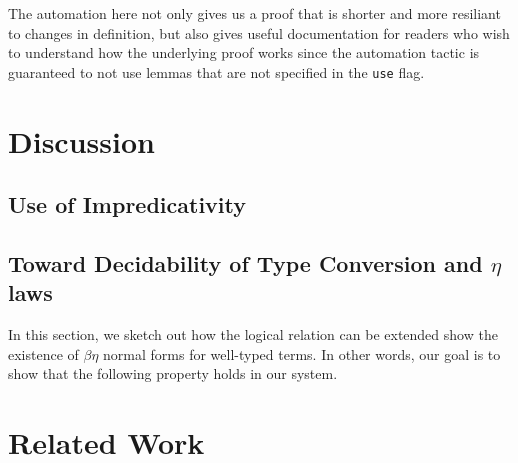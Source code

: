 \documentclass[acmsmall]{acmart}
\begin{document}
The automation here not only gives us a proof that is shorter and more
resiliant to changes in definition, but also gives useful
documentation for readers who wish to understand how the underlying
proof works since the automation tactic is guaranteed to not use
lemmas that are not specified in the \texttt{use} flag.
\section{Discussion}
\label{sec:discuss}

\subsection{Use of Impredicativity}

\subsection{Toward Decidability of Type Conversion and $\eta$ laws}
In this section, we sketch out how the logical relation can be extended
show the existence of $\beta\eta$ normal forms for well-typed terms.
In other words, our goal is to show that the following property holds
in our system.

\section{Related Work}
\label{sec:relatedwork}








\end{document}
